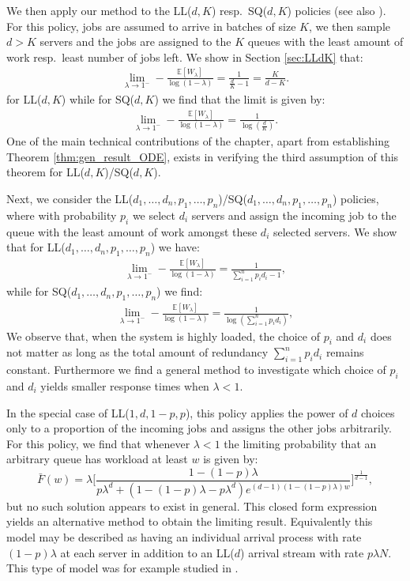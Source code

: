 \documentclass[12pt]{report}
\newcommand{\E}{\mathbb{E}}
\begin{document}
We then apply our method to the LL($d,K$) resp.~SQ($d,K$) policies (see also \cite{van2019global, ying2017power}). For this policy, jobs are assumed to arrive in batches of size $K$, we then sample $d > K$ servers and the jobs are assigned to the $K$ queues with the least amount of work resp.~least number of jobs left. We show in Section \ref{sec:LLdK} that:
\begin{align}
 \lim_{\lambda \rightarrow 1^-} -\frac{\E[W_\lambda]}{\log(1-\lambda)} = \frac{1}{\frac{d}{K} - 1}=\frac{K}{d-K}. \label{eq:lim_LLdK}
\end{align}
for LL($d,K$) while for SQ($d,K$) we find that the limit is given by:
\begin{align}
	\lim_{\lambda \rightarrow 1^-} -\frac{\E[W_\lambda]}{\log(1-\lambda)} = \frac{1}{\log\left(\frac{d}{K}\right)}. \label{eq:lim_SQdK}
\end{align}
One of the main technical contributions of the chapter, apart from establishing Theorem
\ref{thm:gen_result_ODE}, exists in verifying the third assumption of this theorem for LL($d,K$)/SQ($d,K$).

Next, we consider the LL($d_1,\dots,d_n,p_1,\dots,p_n$)/SQ($d_1,\dots,d_n,p_1,\dots,p_n$) policies, where with probability $p_i$ we select $d_i$ servers and assign the incoming job to the queue with the least amount of work amongst these $d_i$ selected servers.
We show that for LL($d_1,\dots,d_n,p_1,\dots,p_n$) we have:
\begin{align*}
 \lim_{\lambda \rightarrow 1^-} -\frac{\E[W_\lambda]}{\log(1-\lambda)} =\frac{1}{\sum_{i=1}^n p_i d_i - 1},
\end{align*}
while for SQ($d_1,\dots,d_n,p_1,\dots,p_n$) we find:
\begin{align*}
	\lim_{\lambda \rightarrow 1^-} -\frac{\E[W_\lambda]}{\log(1-\lambda)} =\frac{1}{\log\left(\sum_{i=1}^n p_i d_i\right)},
\end{align*}
We observe that, when the system is highly loaded, the choice of $p_i$ and $d_i$ does not matter as long as the total amount of redundancy $\sum_{i=1}^n p_i d_i$ remains constant. Furthermore we find a general method to investigate which choice of $p_i$ and $d_i$ yields smaller response times when $\lambda < 1$.

In the special case of LL($1,d,1-p,p$), this policy applies the power of $d$ choices only to a proportion of the incoming jobs and assigns the other jobs arbitrarily. For this policy, we find that whenever $\lambda < 1$ the limiting probability that an arbitrary queue has workload at least $w$ is given by:
\begin{equation}\label{eq:exp_LLdp_WLdist}
\bar F(w)
=
\lambda \bigg[ \frac{1-(1-p)\lambda}{p \lambda^d +(1-(1-p)\lambda-p\lambda^d) e^{(d-1)(1-(1-p)\lambda)w}} \bigg]^{\frac{1}{d-1}},
\end{equation}
but no such solution appears to exist in general. This closed form expression yields an alternative method to obtain the limiting result. Equivalently this model may be described as having an individual arrival process with rate $(1-p)\lambda$ at each server in addition to an LL($d$) arrival stream with rate $p\lambda N$. This type of model was for example studied in \cite{bu2020approximations}.
\end{document}
